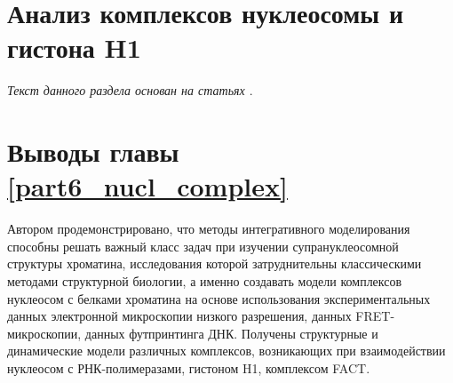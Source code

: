 \section{Анализ комплексов нуклеосомы и гистона H1}
\textit{Текст данного раздела основан на статьях \cite{gorkovets_joint_2018,armeev_modeling_2016} }.



\section{Выводы главы \ref{part6_nucl_complex}}

Автором продемонстрировано, что методы интегративного моделирования способны решать важный класс задач при изучении супрануклеосомной структуры хроматина, исследования которой затруднительны классическими методами структурной биологии, а именно создавать модели комплексов нуклеосом с белками хроматина на основе использования экспериментальных данных электронной микроскопии низкого разрешения, данных FRET-микроскопии, данных футпринтинга ДНК. Получены структурные и динамические модели различных комплексов, возникающих при взаимодействии нуклеосом с РНК-полимеразами, гистоном H1, комплексом FACT.




 
